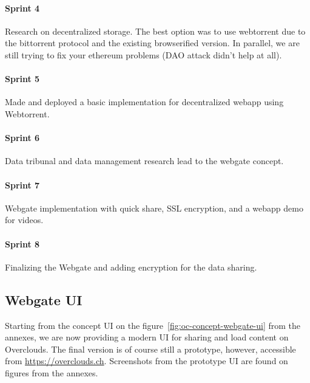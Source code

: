 \paragraph{Sprint 4} Research on decentralized storage. The best option was to use webtorrent due to the bittorrent protocol and the existing browserified version. In parallel, we are still trying to fix your ethereum problems (DAO attack didn't help at all).
\paragraph{Sprint 5} Made and deployed a basic implementation for decentralized webapp using Webtorrent. 
\paragraph{Sprint 6} Data tribunal and data management research lead to the webgate concept. 
\paragraph{Sprint 7} Webgate implementation with quick share, SSL encryption, and a webapp demo for videos.
\paragraph{Sprint 8} Finalizing the Webgate and adding encryption for the data sharing.

\subsection{Webgate UI} Starting from the concept UI on the figure~\ref{fig:oc-concept-webgate-ui} from the annexes, we are now providing a modern UI for sharing and load content on Overclouds. The final version is of course still a prototype, however, accessible from \url{https://overclouds.ch}. Screenshots from the prototype UI are found on figures from the annexes.

